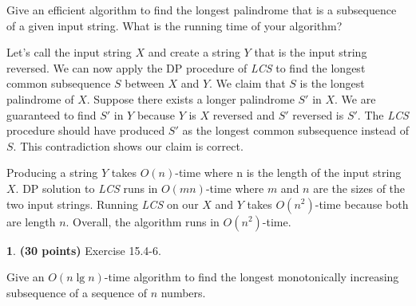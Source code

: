 \documentclass[11pt]{article}
\theoremstyle{definition}
\theoremstyle{theorem}
\newtheorem{prob}{}
\newcommand{\solution}{\medskip\noindent{\color{DarkBlue}\textbf{Solution:}}}
\begin{document}
Give an efficient algorithm to find the longest palindrome that is a subsequence of a given input string. What is the running time of your algorithm?

\solution

Let's call the input string $X$ and create a string $Y$ that is the input string reversed. We can now apply the DP procedure of \textit{LCS} to find the longest common subsequence $S$ between $X$ and $Y$. We claim that $S$ is the longest palindrome of $X$. Suppose there exists a longer palindrome $S'$ in $X$. We are guaranteed to find $S'$ in $Y$ because $Y$ is $X$ reversed and $S'$ reversed is $S'$. The \textit{LCS} procedure should have produced $S'$ as the longest common subsequence instead of $S$. This contradiction shows our claim is correct. 

Producing a string $Y$ takes $O(n)$-time where n is the length of the input string $X$. DP solution to \textit{LCS} runs in $O(mn)$-time where $m$ and $n$ are the sizes of the two input strings. Running \textit{LCS} on our $X$ and $Y$ takes $O(n^2)$-time because both are length $n$. Overall, the algorithm runs in $O(n^2)$-time.


\newpage
\begin{prob} \textbf{(30 points)} Exercise 15.4-6.
\end{prob}

Give an $O(n\lg n)$-time algorithm to find the longest monotonically increasing subsequence of a sequence of $n$ numbers.

\solution
\end{document}
